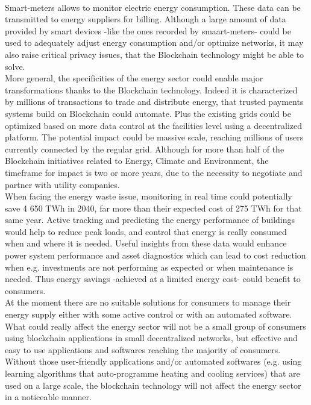 \documentclass[11pt]{article}
\begin{document}
\\
Smart-meters allows to monitor electric energy consumption. These data can be transmitted to energy suppliers for billing. Although a large amount of data provided by smart devices -like the ones recorded by smaart-meters- could be used to adequately adjust energy consumption and/or optimize networks, it may also raise critical privacy issues,\cite{4} that the Blockchain technology might be able to solve.\\
More general, the specificities of the energy sector could enable major transformations thanks to the Blockchain technology. Indeed it is characterized by millions of transactions to trade and distribute energy, that trusted payments systems build on Blockchain could automate. Plus the existing grids could be optimized based on more data control at the facilities level using a decentralized platform. The potential impact could be massive scale, reaching millions of users currently connected by the regular grid. Although for more than half of the Blockchain initiatives related to Energy, Climate and Environment, the timeframe for impact is two or more years, due to the necessity to negotiate and partner with utility companies.\cite{5}\\
When facing the energy waste issue, monitoring in real time could potentially save 4 650 TWh in 2040, far more than their expected cost of 275 TWh for that same year. Active tracking and predicting the energy performance of buildings would help to reduce peak loads, and control that energy is really consumed when and where it is needed. Useful insights from these data would enhance power system performance and asset diagnostics which can lead to cost reduction when e.g. investments are not performing as expected or when maintenance is needed. Thus energy savings -achieved at a limited energy cost- could benefit to consumers.\cite{6}\\
At the moment there are no suitable solutions for consumers to manage their energy supply either with some active control or with an automated software. What could really affect the energy sector will not be a small group of consumers using blockchain applications in small decentralized networks, but effective and easy to use applications and softwares reaching the majority of consumers. Without those user-friendly applications and/or automated softwares (e.g. using learning algorithms that auto-programme heating and cooling services) that are used on a large scale, the blockchain technology will not affect the energy sector in a noticeable manner.\cite{7}\\
\end{document}
